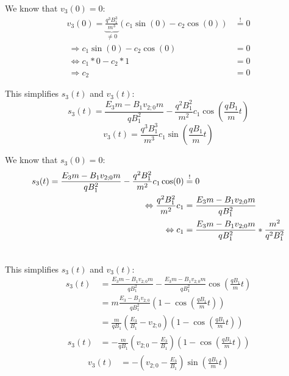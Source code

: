 \documentclass[english, a4paper, 10pt]{article}
\begin{document}
We know that $v_3(0) = 0$:
\begin{equation}
\begin{split}
v_3(0) = \underbrace{\frac{q^3 B_1^3}{m^3}}_{\neq 0} (c_1 \sin(0) - c_2 \cos(0)) &\overset{\text{!}}{=} 0  \\\
\Rightarrow c_1 \sin(0) - c_2 \cos(0) &= 0 \\\
\Leftrightarrow c_1 * 0 - c_2 * 1 &= 0 \\\
\Rightarrow c_2 &= 0
\end{split}
\end{equation}

This simplifies $s_3(t)$ and $v_3(t)$:
\begin{equation}
s_3(t) = \frac{E_3 m - B_1 v_{2;0} m}{q B_1^2} - \frac{q^2 B_1^2}{m^2} c_1 \cos\left(\frac{q B_1}{m} t\right)
\end{equation}
%
\begin{equation}
v_3(t) = \frac{q^3 B_1^3}{m^3} c_1 \sin\left(\frac{q B_1}{m} t\right)
\end{equation}

We know that $s_3(0) = 0$:
\begin{equation}
\begin{split}
s_3(t) = \frac{E_3 m - B_1 v_{2;0} m}{q B_1^2} - \frac{q^2 B_1^2}{m^2} c_1 \cos(0) &\overset{\text{!}}{=} 0 \\\
\Leftrightarrow \hfill \frac{q^2 B_1^2}{m^2} c_1 &= \frac{E_3 m - B_1 v_{2;0} m}{q B_1^2} \\\
\Leftrightarrow \hfill c_1 &= \frac{E_3 m - B_1 v_{2;0} m}{q B_1^2} * \frac{m^2}{q^2 B_1^2} \\\
\end{split}
\end{equation}

This simplifies $s_3(t)$ and $v_3(t)$:
\begin{equation}
\begin{split}
s_3(t) 	&= \frac{E_3 m - B_1 v_{2;0} m}{q B_1^2} - \frac{E_3 m - B_1 v_{2;0} m}{q B_1^2} \cos\left(\frac{q B_1}{m} t\right)  \\\
		&= m \frac{E_3 - B_1 v_{2;0}}{q B_1^2} \left( 1 - \cos\left(\frac{q B_1}{m} t\right)\right) \\\
%
		&= 	\frac{m}{q B_1}	\left( \frac{E_3}{B_1} - v_{2;0} \right) \left( 1 - \cos\left(\frac{q B_1}{m} t\right)\right) \\\
%
s_3(t)  &= -\frac{m}{q B_1}	\left( v_{2;0} -\frac{E_3}{B_1} \right) \left( 1 - \cos\left(\frac{q B_1}{m} t\right)\right)
\end{split}
\end{equation}
%
\begin{equation}
\begin{split}
v_3(t) &= -\left(v_{2;0} - \frac{E_3}{B_1}\right) \sin\left(\frac{q B_1}{m} t\right)
\end{split}
\end{equation}
\end{document}

